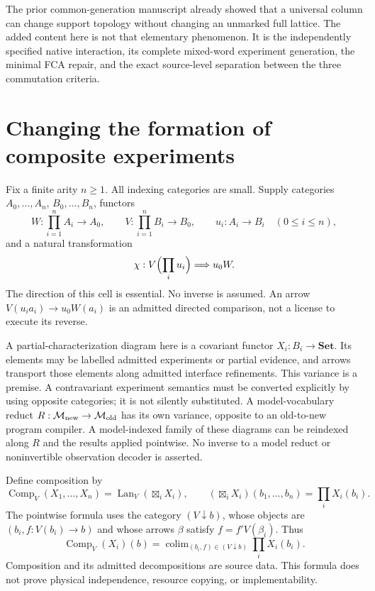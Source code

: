\documentclass[11pt]{article}
\theoremstyle{definition}\newtheorem{definition}[theorem]{Definition}
\theoremstyle{remark}\newtheorem{remark}[theorem]{Remark}
\newcommand{\Set}{\mathbf{Set}}
\newcommand{\Lan}{\operatorname{Lan}}
\begin{document}
The prior common-generation manuscript already showed that a universal
column can change support topology without changing an unmarked full
lattice. The added content here is not that elementary phenomenon.
It is the independently specified native interaction, its complete
mixed-word experiment generation, the minimal FCA repair, and the
exact source-level separation between the three commutation criteria.



\section{Changing the formation of composite experiments}\label{sec:decomposition}
Fix a finite arity $n\geq1$. All indexing categories are small. Supply
categories $A_0,\ldots,A_n$, $B_0,\ldots,B_n$, functors
\[
 W:\prod_{i=1}^n A_i\longrightarrow A_0,\qquad
 V:\prod_{i=1}^n B_i\longrightarrow B_0,
 \qquad u_i:A_i\longrightarrow B_i\quad(0\leq i\leq n),
\]
and a natural transformation
\begin{equation}\label{eq:cell}
 \chi:V\Bigl(\prod_i u_i\Bigr)\Longrightarrow u_0W.
\end{equation}
The direction of this cell is essential. No inverse is assumed.
An arrow $V(u_i a_i)\to u_0W(a_i)$ is an admitted directed comparison,
not a license to execute its reverse.

A partial-characterization diagram here is a covariant functor
$X_i:B_i\to\Set$. Its elements may be labelled admitted experiments or
partial evidence, and arrows transport those elements along admitted
interface refinements. This variance is a premise. A contravariant
experiment semantics must be converted explicitly by using opposite
categories; it is not silently substituted. A model-vocabulary reduct
$R:\mathcal M_{\rm new}\to\mathcal M_{\rm old}$ has its own variance,
opposite to an old-to-new program compiler. A model-indexed family of
these diagrams can be reindexed along $R$ and the results applied pointwise.
No inverse to a model reduct or noninvertible observation decoder is
asserted.

Define composition by
\[
 \operatorname{Comp}_V(X_1,\ldots,X_n)
   =\Lan_V(\mathop{\boxtimes}_i X_i),\qquad
 (\mathop{\boxtimes}_iX_i)(b_1,\ldots,b_n)=\prod_iX_i(b_i).
\]
The pointwise formula uses the category $(V\downarrow b)$, whose objects
are $(b_i,f:V(b_i)\to b)$ and whose arrows $\beta$ satisfy
$f=f'V(\beta_i)$. Thus
\[
 \operatorname{Comp}_V(X_i)(b)
   =\mathop{\operatorname{colim}}_{(b_i,f)\in(V\downarrow b)}
            \prod_iX_i(b_i).
\]
Composition and its admitted decompositions are source data. This formula
does not prove physical independence, resource copying, or implementability.
\end{document}
